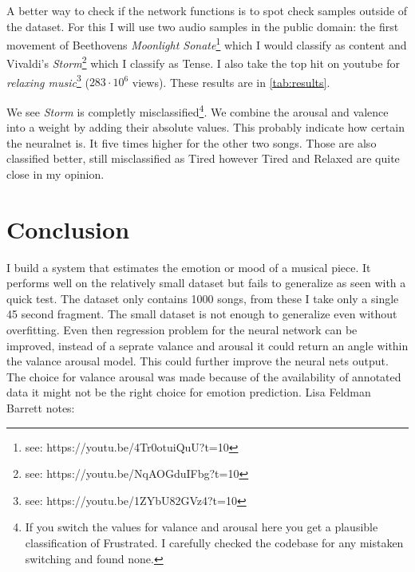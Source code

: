 \documentclass[lang=en, hanging-titles=true]{skrapport}
\begin{document}
A better way to check if the network functions is to spot check samples outside of the dataset. For this I will use two audio samples in the public domain: the first movement of Beethovens \textit{Moonlight Sonate}\footnote{see: https://youtu.be/4Tr0otuiQuU?t=10} which I would classify as content and Vivaldi's \textit{Storm}\footnote{see: https://youtu.be/NqAOGduIFbg?t=10} which I classify as Tense. I also take the top hit on youtube for \textit{relaxing music}\footnote{see: https://youtu.be/1ZYbU82GVz4?t=10} ($283\cdot10^6$ views). These results are in \cref{tab:results}.


We see \textit{Storm} is completly misclassified\footnote{If you switch the values for valance and arousal here you get a plausible classification of Frustrated. I carefully checked the codebase for any mistaken switching and found none.}. We combine the arousal and valence into a weight by adding their absolute values. This probably indicate how certain the neuralnet is. It five times higher for the other two songs. Those are also classified better, still misclassified as Tired however Tired and Relaxed are quite close in my opinion.

\section{Conclusion}
I build a system that estimates the emotion or mood of a musical piece. It performs well on the relatively small dataset but fails to generalize as seen with a quick test. The dataset only contains 1000 songs, from these I take only a single 45 second fragment. The small dataset is not enough to generalize even without overfitting. Even then regression problem for the neural network can be improved, instead of a seprate valance and arousal it could return an angle within the valance arousal model. This could further improve the neural nets output. The choice for valance arousal was made because of the availability of annotated data it might not be the right choice for emotion prediction. Lisa Feldman Barrett\cite{feldman} notes:
\end{document}
